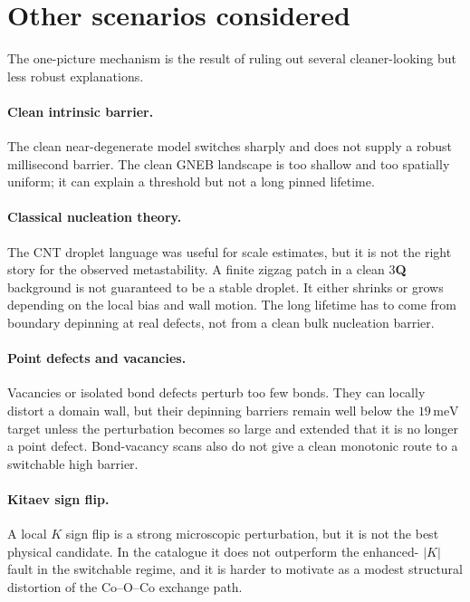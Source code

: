\documentclass[aps,prb,twocolumn,superscriptaddress,floatfix,nofootinbib]{revtex4-2}
\newcommand{\threeQ}{3\textbf{Q}}
\newcommand{\meV}{\,\mathrm{meV}}
\begin{document}
\section{Other scenarios considered}

The one-picture mechanism is the result of ruling out several cleaner-looking
but less robust explanations.

\paragraph{Clean intrinsic barrier.}
The clean near-degenerate model switches sharply and does not supply a robust
millisecond barrier.  The clean GNEB landscape is too shallow and too spatially
uniform; it can explain a threshold but not a long pinned lifetime.

\paragraph{Classical nucleation theory.}
The CNT droplet language was useful for scale estimates, but it is not the right
story for the observed metastability.  A finite zigzag patch in a clean \threeQ{}
background is not guaranteed to be a stable droplet.  It either shrinks or grows
depending on the local bias and wall motion.  The long lifetime has to come from
boundary depinning at real defects, not from a clean bulk nucleation barrier.

\paragraph{Point defects and vacancies.}
Vacancies or isolated bond defects perturb too few bonds.  They can locally
distort a domain wall, but their depinning barriers remain well below the
$19\meV$ target unless the perturbation becomes so large and extended that it is
no longer a point defect.  Bond-vacancy scans also do not give a clean monotonic
route to a switchable high barrier.

\paragraph{Kitaev sign flip.}
A local $K$ sign flip is a strong microscopic perturbation, but it is not the
best physical candidate.  In the catalogue it does not outperform the enhanced-
$|K|$ fault in the switchable regime, and it is harder to motivate as a modest
structural distortion of the Co--O--Co exchange path.
\end{document}
